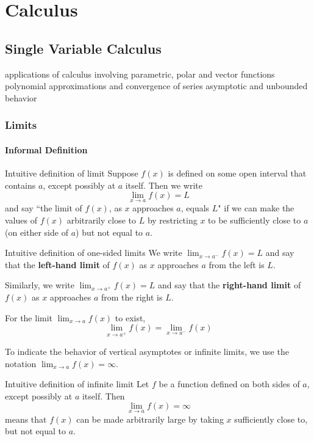 \part{Calculus}
\chapter{Single Variable Calculus}

applications of calculus involving parametric, polar and vector functions
polynomial approximations and convergence of series
asymptotic and unbounded behavior

\section{Limits}
\subsection{Informal Definition}
\begin{defn}{Intuitive definition of limit}{}
Suppose $f(x)$ is defined on some open interval that contains $a$, except possibly at $a$ itself. Then we write
\[ \lim_{x\to a} f(x) = L \]
and say ``the limit of $f(x)$, as $x$ approaches $a$, equals $L$" if we can make the values of $f(x)$ arbitrarily close to $L$ by restricting $x$ to be sufficiently close to $a$ (on either side of $a$) but not equal to $a$.
\end{defn}

\begin{defn}{Intuitive definition of one-sided limits}{}
We write $\lim_{x\to a^-}f(x)=L$ and say that the \textbf{left-hand limit} of $f(x)$ as $x$ approaches $a$ from the left is $L$.

Similarly, we write $\lim_{x\to a^+}f(x)=L$ and say that the \textbf{right-hand limit} of $f(x)$ as $x$ approaches $a$ from the right is $L$.
\end{defn}

For the limit $\lim_{x\to a}f(x)$ to exist,
\[ \lim_{x\to a^+}f(x) = \lim_{x\to a^-}f(x) \]

To indicate the behavior of vertical asymptotes or infinite limits, we use the notation $\lim_{x\to a}f(x)=\infty$.

\begin{defn}{Intuitive definition of infinite limit}{}
Let $f$ be a function defined on
both sides of $a$, except possibly at $a$ itself. Then
\[ \lim_{x\to a}f(x)=\infty \]
means that $f(x)$ can be made arbitrarily large by taking $x$ sufficiently close to, but not equal to $a$.
\end{defn}

